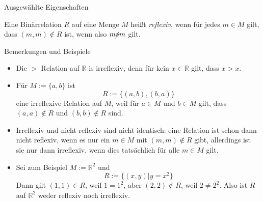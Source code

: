 \documentclass[
  8pt,
  ignorenonframetext,
]{beamer}
\providecommand{\tightlist}{%
  \setlength{\itemsep}{0pt}\setlength{\parskip}{0pt}}
\begin{document}
\begin{frame}{Ausgewählte Eigenschaften}
\protect\hypertarget{ausgewuxe4hlte-eigenschaften-1}{}
\footnotesize
\begin{definition}[Irreflexivität]
\justifying
Eine Binärrelation $R$ auf eine Menge $M$ heißt \textit{reflexiv}, wenn für
jedes $m \in M$ gilt, dass $(m,m)\notin R$ ist, wenn also $m \cancel{\diamond} m$ gilt.
\end{definition}

Bemerkungen und Beispiele

\begin{itemize}
\tightlist
\item
  Die \(>\) Relation auf \(\mathbb{R}\) is irreflexiv, denn für kein
  \(x \in \mathbb{R}\) gilt, dass \(x > x\).
\item
  Für \(M := \{a,b\}\) ist \begin{equation}
  R := \{(a,b), (b,a)\}
  \end{equation} eine irreflexive Relation auf \(M\), weil für
  \(a \in M\) und \(b \in M\) gilt, dass \((a,a)\notin R\) und
  \((b,b)\notin R\) sind.
\item
  Irreflexiv und nicht reflexiv sind nicht identisch: eine Relation ist
  schon dann nicht reflexiv, wenn es nur ein \(m \in M\) mit
  \((m,m)\notin R\) gibt, allerdings ist sie nur dann irreflexiv, wenn
  dies tatsächlich für alle \(m \in M\) gilt.
\item
  Sei zum Beispiel \(M := \mathbb{R}^2\) und \begin{equation}
  R := \{(x,y)|y = x^2\}
  \end{equation} Dann gilt \((1,1) \in R\), weil \(1 = 1^2\), aber
  \((2,2) \notin R\), weil \(2 \neq 2^2\). Also ist \(R\) auf
  \(\mathbb{R}^2\) weder reflexiv noch irreflexiv.
\end{itemize}
\end{frame}
\end{document}
